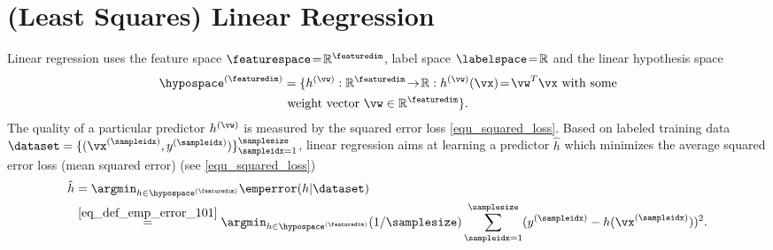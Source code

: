 \documentclass[12pt]{report}
\begin{document}
\begin{figure}
\begin{tikzpicture}[auto]
\end{tikzpicture}
\end{figure}


\section{(Least Squares) Linear Regression} 
\label{sec_lin_regression}

Linear regression uses the feature space $\featurespace\!=\!\mathbb{R}^{\featuredim}$,  label space $\labelspace\!=\!\mathbb{R}$ and the linear hypothesis space 
\begin{align}
\label{equ_lin_hypospace}
\hypospace^{(\featuredim)} & = \{ h^{(\vw)}: \mathbb{R}^{\featuredim}\!\rightarrow\!\mathbb{R}: h^{(\vw)}(\vx)\!=\!\vw^{T} \vx \mbox{ with some} \nonumber \\ 
& \mbox{ weight vector } \vw \in \mathbb{R}^{\featuredim} \}.
\end{align}  
The quality of a particular predictor $h^{(\vw)}$ is measured by the squared error loss \eqref{equ_squared_loss}. 
Based on labeled training data $\dataset =\{ (\vx^{(\sampleidx)},y^{(\sampleidx)}) \}_{\sampleidx=1}^{\samplesize}$, linear 
regression aims at learning a predictor $\hat{h}$ which minimizes the average squared error loss (mean squared error) (see \eqref{equ_squared_loss})
\begin{align} 
\label{equ_opt_pred_linreg}
\hat{h} & = \argmin_{h \in \hypospace^{(\featuredim)}  }\emperror(h|\dataset)  \\ \nonumber 
& \stackrel{\eqref{eq_def_emp_error_101}}{=} \argmin_{h \in \hypospace^{(\featuredim)}  }  (1/\samplesize) \sum_{\sampleidx=1}^{\samplesize} (y^{(\sampleidx)} - h(\vx^{(\sampleidx)}))^{2}.
\end{align} 
\end{document}
